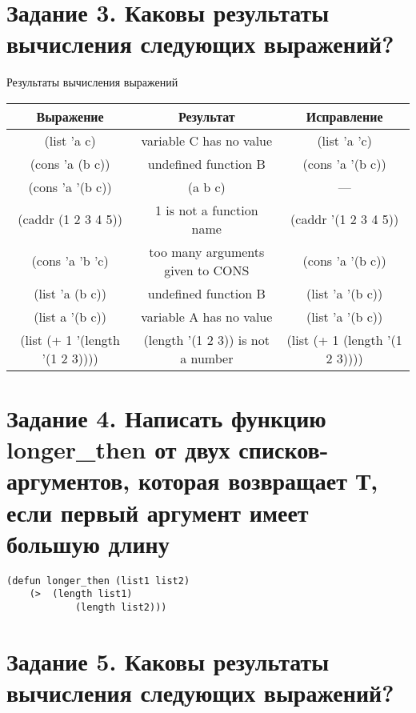\section{Задание 3. Каковы результаты вычисления следующих выражений?}

\begin{center}
	\begin{threeparttable}
		\captionsetup{justification=raggedright,singlelinecheck=off}
		\caption{\label{3}Результаты вычисления выражений}
		\centering
		\begin{tabular}{|c|c|c|}
			\hline
			Выражение & Результат & Исправление\\
			\hline
			(list 'a c) & variable C has no value & (list 'a 'c)\\
			\hline
			(cons 'a (b c)) & undefined function B & (cons 'a '(b c))\\
			\hline
			(cons 'a '(b c)) & (a b c) & ---\\
			\hline
			(caddr (1 2 3 4 5)) & 1 is not a function name & (caddr '(1 2 3 4 5))\\
			\hline
			(cons 'a 'b 'c) & too many arguments given to CONS & (cons 'a '(b c))\\
			\hline
			(list 'a (b c)) & undefined function B & (list 'a '(b c))\\
			\hline
			(list a '(b c)) & variable A has no value & (list 'a '(b c))\\
			\hline
			(list (+ 1 '(length '(1 2 3)))) & (length '(1 2 3)) is not a number & (list (+ 1 (length '(1 2 3))))\\
			\hline
		\end{tabular}
	\end{threeparttable}
\end{center}

\section{Задание 4. Написать функцию longer\_then от двух списков-аргументов, которая возвращает Т, если первый аргумент имеет большую длину}

\begin{lstlisting}
(defun longer_then (list1 list2)
	(>  (length list1)
			(length list2)))
\end{lstlisting}

\section{Задание 5. Каковы результаты вычисления следующих выражений?}

